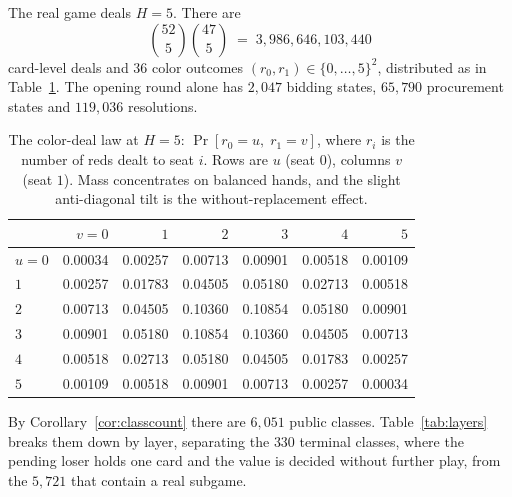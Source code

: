 \documentclass[11pt]{article}
\theoremstyle{plain}
\theoremstyle{definition}
\theoremstyle{remark}
\begin{document}
The real game deals $H=5$. There are
\[
  \binom{52}{5}\binom{47}{5} \;=\; 3{,}986{,}646{,}103{,}440
\]
card-level deals and $36$ color outcomes $(r_0,r_1)\in\{0,\dots,5\}^2$,
distributed as in Table~\ref{tab:deallaw}. The opening round alone has
$2{,}047$ bidding states, $65{,}790$ procurement states and $119{,}036$
resolutions.

\begin{table}[t]
\centering
\caption{The color-deal law at $H=5$: $\Pr[r_0=u,\;r_1=v]$, where $r_i$ is
the number of reds dealt to seat $i$. Rows are $u$ (seat $0$), columns $v$
(seat $1$). Mass concentrates on balanced hands, and the slight
anti-diagonal tilt is the without-replacement effect.}
\label{tab:deallaw}
\begin{tabular}{@{}lrrrrrr@{}}
\toprule
& $v=0$ & $1$ & $2$ & $3$ & $4$ & $5$\\
\midrule
$u=0$ & 0.00034 & 0.00257 & 0.00713 & 0.00901 & 0.00518 & 0.00109\\
$1$ & 0.00257 & 0.01783 & 0.04505 & 0.05180 & 0.02713 & 0.00518\\
$2$ & 0.00713 & 0.04505 & 0.10360 & 0.10854 & 0.05180 & 0.00901\\
$3$ & 0.00901 & 0.05180 & 0.10854 & 0.10360 & 0.04505 & 0.00713\\
$4$ & 0.00518 & 0.02713 & 0.05180 & 0.04505 & 0.01783 & 0.00257\\
$5$ & 0.00109 & 0.00518 & 0.00901 & 0.00713 & 0.00257 & 0.00034\\
\bottomrule
\end{tabular}
\end{table}

By Corollary~\ref{cor:classcount} there are $6{,}051$ public classes.
Table~\ref{tab:layers} breaks them down by layer, separating the $330$
terminal classes, where the pending loser holds one card and the value is
decided without further play, from the $5{,}721$ that contain a real
subgame.
\end{document}

